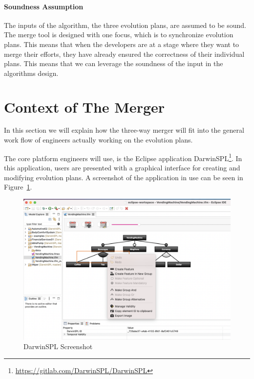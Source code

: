 \documentclass[a4paper,english]{ifimaster}
\begin{document}
\paragraph{Soundness Assumption}%
\label{par:soundness_assumption}

The inputs of the algorithm, the three evolution plans, are assumed to be sound. The merge tool is designed with one focus, which is to synchronize evolution plans. This means that when the developers are at a stage where they want to merge their efforts, they have already ensured the correctness of their individual plans. This means that we can leverage the soundness of the input in the algorithms design. 

\section{Context of The Merger}%
\label{sec:context_of_the_merger}

In this section we will explain how the three-way merger will fit into the general work flow of engineers actually working on the evolution plans.

The core platform engineers will use, is the Eclipse application DarwinSPL\footnote{\url{https://gitlab.com/DarwinSPL/DarwinSPL}}. In this application, users are presented with a graphical interface for creating and modifying evolution plans. A screenshot of the application in use can be seen in Figure~\ref{fig:darwin_spl_screenshot}. 

\begin{figure}[htpb]
  \centering
  \includegraphics[width=\linewidth]{darwin_spl_screenshot.png}
  \caption{DarwinSPL Screenshot}%
  \label{fig:darwin_spl_screenshot}
\end{figure}
\end{document}
